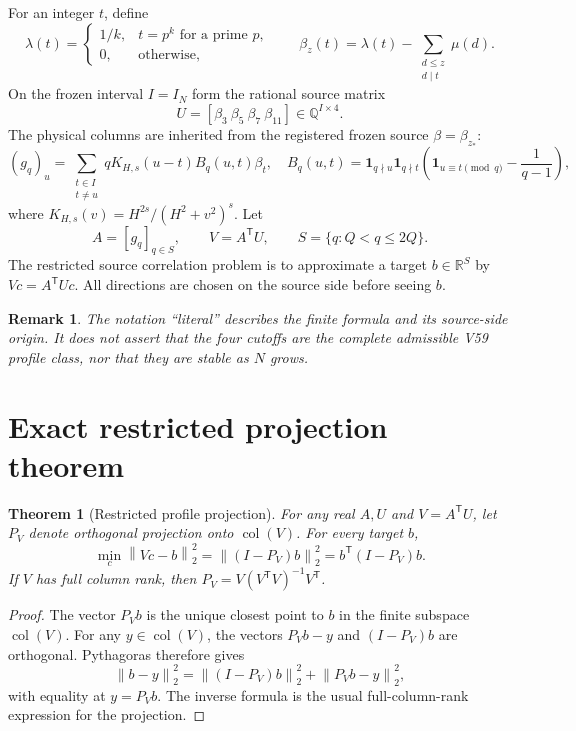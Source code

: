 \documentclass[10pt]{article}
\newtheorem{theorem}{Theorem}
\newtheorem{remark}{Remark}
\newcommand{\Q}{\mathbb{Q}}
\newcommand{\R}{\mathbb{R}}
\newcommand{\norm}[1]{\left\lVert #1\right\rVert}
\begin{document}
For an integer $t$, define
\[
 \lambda(t)=\begin{cases}1/k,&t=p^k\text{ for a prime }p,\\0,&\text{otherwise},\end{cases}
 \qquad
 \beta_z(t)=\lambda(t)-\sum_{\substack{d\leq z\\d\mid t}}\mu(d).
\]
On the frozen interval $I=I_N$ form the rational source matrix
\[
 U=[\beta_3\ \beta_5\ \beta_7\ \beta_{11}]\in\Q^{I\times4}.
\]
The physical columns are inherited from the registered frozen source
$\beta=\beta_{z_*}$:
\[
 (g_q)_u=\sum_{\substack{t\in I\\t\ne u}}
 qK_{H,s}(u-t)B_q(u,t)\beta_t,
 \quad
 B_q(u,t)=\mathbf1_{q\nmid u}\mathbf1_{q\nmid t}
 \left(\mathbf1_{u\equiv t\pmod q}-\frac1{q-1}\right),
\]
where $K_{H,s}(v)=H^{2s}/(H^2+v^2)^s$.  Let
\[
 A=[g_q]_{q\in S},\qquad V=A^{\mathsf T}U,
 \qquad S=\{q:Q<q\leq2Q\}.
\]
The restricted source correlation problem is to approximate a target
$b\in\R^S$ by $Vc=A^{\mathsf T}Uc$.  All directions are chosen on the
source side before seeing $b$.

\begin{remark}
The notation ``literal'' describes the finite formula and its source-side
origin.  It does not assert that the four cutoffs are the complete admissible
V59 profile class, nor that they are stable as $N$ grows.
\end{remark}

\section{Exact restricted projection theorem}

\begin{theorem}[Restricted profile projection]
For any real $A,U$ and $V=A^{\mathsf T}U$, let $P_V$ denote orthogonal
projection onto $\operatorname{col}(V)$.  For every target $b$,
\[
 \min_{c}\norm{Vc-b}_2^2
 =\norm{(I-P_V)b}_2^2=b^{\mathsf T}(I-P_V)b.
 \label{eq:projection}
\]
If $V$ has full column rank, then
$P_V=V(V^{\mathsf T}V)^{-1}V^{\mathsf T}$.
\end{theorem}

\begin{proof}
The vector $P_Vb$ is the unique closest point to $b$ in the finite
subspace $\operatorname{col}(V)$.  For any $y\in\operatorname{col}(V)$,
the vectors $P_Vb-y$ and $(I-P_V)b$ are orthogonal.  Pythagoras therefore
gives
\[
 \norm{b-y}_2^2=\norm{(I-P_V)b}_2^2+\norm{P_Vb-y}_2^2,
\]
with equality at $y=P_Vb$.  The inverse formula is the usual full-column-rank
expression for the projection.
\end{proof}
\end{document}
